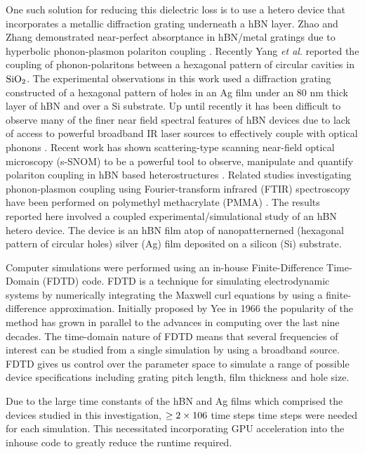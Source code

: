 \documentclass[12pt]{report}
\begin{document}
    One such solution for reducing this dielectric loss is to use a hetero device that incorporates a metallic diffraction grating underneath a hBN layer. Zhao and Zhang demonstrated near-perfect absorptance in hBN/metal gratings due to hyperbolic phonon-plasmon polariton coupling \cite{Zhao:17}. Recently Yang \textit{et al}.\cite{Yang:20} reported the coupling of phonon-polaritons between a hexagonal pattern of circular cavities in $\rm SiO_{2}$. The experimental observations in this work used a diffraction grating constructed of a hexagonal pattern of holes in an Ag film under an 80 nm thick layer of hBN and over a Si substrate. Up until recently it has been difficult to observe many of the finer near field spectral features of hBN devices due to lack of access to powerful broadband IR laser sources to effectively couple with optical phonons \cite{Yang:20, Alfaro-Mozaz:17, Autore:18}. Recent work has shown scattering-type scanning near-field optical microscopy (s-SNOM) to be a powerful tool to observe, manipulate and quantify polariton coupling in hBN based heterostructures \cite{Fali:19, Folland:18}. Related studies investigating phonon-plasmon coupling using Fourier-transform infrared (FTIR) spectroscopy have been performed on polymethyl methacrylate (PMMA) \cite{Cheng:15, Wan:16}. The results reported here involved a coupled experimental/simulational study of an hBN hetero device. The device is an hBN film atop of nanopatternerned (hexagonal pattern of circular holes) silver (Ag) film deposited on a silicon (Si) substrate.

    Computer simulations were performed using an in-house Finite-Difference Time-Domain (FDTD) code. FDTD is a technique for simulating electrodynamic systems by numerically integrating the Maxwell curl equations by using a finite-difference approximation. Initially proposed by Yee in 1966 \cite{Kane:66} the popularity of the method has grown in parallel to the advances in computing over the last nine decades. The time-domain nature of FDTD means that several frequencies of interest can be studied from a single simulation by using a broadband source. FDTD gives us control over the parameter space to simulate a range of possible device specifications including grating pitch length, film thickness and hole size.

    Due to the large time constants of the hBN and Ag films which comprised the devices studied in this investigation, $\rm \geq 2 \times 106$ time steps time steps were needed for each simulation. This necessitated incorporating GPU acceleration into the inhouse code to greatly reduce the runtime required.
\end{document}
